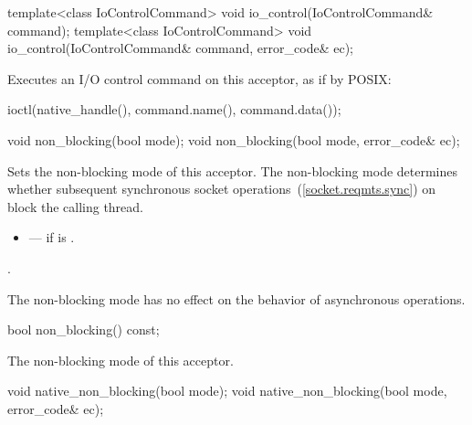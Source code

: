 \begin{itemdecl}
template<class IoControlCommand>
  void io_control(IoControlCommand& command);
template<class IoControlCommand>
  void io_control(IoControlCommand& command, error_code& ec);
\end{itemdecl}

\begin{itemdescr}
\pnum
\effects Executes an I/O control command on this acceptor, as if by POSIX:
\begin{codeblock}
ioctl(native_handle(), command.name(), command.data());
\end{codeblock}
\end{itemdescr}

\begin{itemdecl}
void non_blocking(bool mode);
void non_blocking(bool mode, error_code& ec);
\end{itemdecl}

\begin{itemdescr}
\pnum
\effects Sets the non-blocking mode of this acceptor. The non-blocking mode determines whether subsequent synchronous socket operations~(\ref{socket.reqmts.sync}) on  block the calling thread.

\pnum
\errors
\begin{itemize}
\item
{} --- if  is .
\end{itemize}

\pnum
\postconditions {}.

\pnum
 \begin{note} The non-blocking mode has no effect on the behavior of asynchronous operations. \end{note}
\end{itemdescr}

\begin{itemdecl}
bool non_blocking() const;
\end{itemdecl}

\begin{itemdescr}
\pnum
\returns The non-blocking mode of this acceptor.
\end{itemdescr}

\begin{itemdecl}
void native_non_blocking(bool mode);
void native_non_blocking(bool mode, error_code& ec);
\end{itemdecl}

